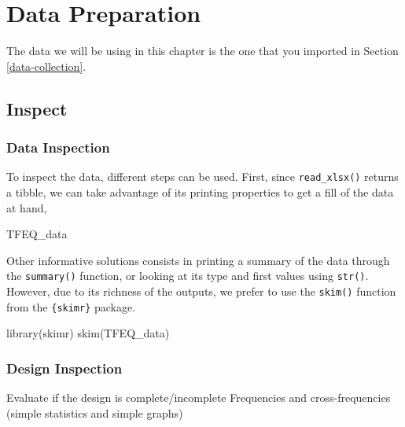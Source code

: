 \documentclass[
]{book}
\newenvironment{Shaded}{\begin{snugshade}}{\end{snugshade}}
\newcommand{\FunctionTok}[1]{\textcolor[rgb]{0.00,0.00,0.00}{#1}}
\newcommand{\NormalTok}[1]{#1}
\begin{document}
\hypertarget{data-prep}{%
\chapter{Data Preparation}\label{data-prep}}

The data we will be using in this chapter is the one that you imported in Section \ref{data-collection}.

\hypertarget{inspect-1}{%
\section{Inspect}\label{inspect-1}}

\hypertarget{data-inspection}{%
\subsection{Data Inspection}\label{data-inspection}}

To inspect the data, different steps can be used.
First, since \texttt{read\_xlsx()} returns a tibble, we can take advantage of its printing properties to get a fill of the data at hand,

\begin{Shaded}
\begin{Highlighting}[]
\NormalTok{TFEQ\_data}
\end{Highlighting}
\end{Shaded}

Other informative solutions consists in printing a summary of the data through the \texttt{summary()} function, or looking at its type and first values using \texttt{str()}. However, due to its richness of the outputs, we prefer to use the \texttt{skim()} function from the \texttt{\{skimr\}} package.

\begin{Shaded}
\begin{Highlighting}[]
\FunctionTok{library}\NormalTok{(skimr)}
\FunctionTok{skim}\NormalTok{(TFEQ\_data)}
\end{Highlighting}
\end{Shaded}

\hypertarget{design-inspection}{%
\subsection{Design Inspection}\label{design-inspection}}

Evaluate if the design is complete/incomplete
Frequencies and cross-frequencies (simple statistics and simple graphs)
\end{document}

